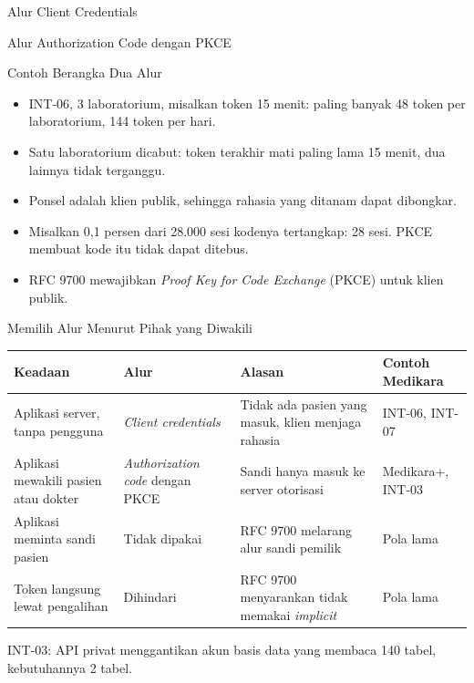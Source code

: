 \documentclass[aspectratio=169, table, 12pt]{beamer}
\begin{document}
\begin{frame}{{\Large Alur Client Credentials}}
  \centering
\end{frame}

\begin{frame}{{\Large Alur Authorization Code dengan PKCE}}
  \centering
\end{frame}

\begin{frame}{{\Large Contoh Berangka Dua Alur}}
  \vspace{6pt}
  \begin{itemize}
    \item INT-06, 3 laboratorium, misalkan token 15 menit: paling banyak 48 token per laboratorium, 144 token per hari.
    \item Satu laboratorium dicabut: token terakhir mati paling lama 15 menit, dua lainnya tidak terganggu.
    \item Ponsel adalah klien publik, sehingga rahasia yang ditanam dapat dibongkar.
    \item Misalkan 0,1 persen dari 28.000 sesi kodenya tertangkap: 28 sesi. PKCE membuat kode itu tidak dapat ditebus.
    \item RFC 9700 mewajibkan \textit{Proof Key for Code Exchange} (PKCE) untuk klien publik.
  \end{itemize}
\end{frame}

\begin{frame}{{\Large Memilih Alur Menurut Pihak yang Diwakili}}
  \footnotesize
  \begin{tabularx}{\textwidth}{>{\raggedright\arraybackslash}X
      >{\raggedright\arraybackslash}p{3.0cm} >{\raggedright\arraybackslash}X >{\raggedright\arraybackslash}p{2.5cm}}
    \hline
    \textbf{Keadaan} & \textbf{Alur} & \textbf{Alasan} & \textbf{Contoh Medikara} \\ \hline
    Aplikasi server, tanpa pengguna & \textit{Client credentials} & Tidak ada pasien yang masuk, klien menjaga rahasia & INT-06, INT-07 \\ \hline
    Aplikasi mewakili pasien atau dokter & \textit{Authorization code} dengan PKCE & Sandi hanya masuk ke server otorisasi & Medikara+, INT-03 \\ \hline
    Aplikasi meminta sandi pasien & Tidak dipakai & RFC 9700 melarang alur sandi pemilik & Pola lama \\ \hline
    Token langsung lewat pengalihan & Dihindari & RFC 9700 menyarankan tidak memakai \textit{implicit} & Pola lama \\ \hline
  \end{tabularx}

  \vspace{6pt}
  \small INT-03: API privat menggantikan akun basis data yang membaca 140 tabel, kebutuhannya 2 tabel.
\end{frame}
\end{document}
